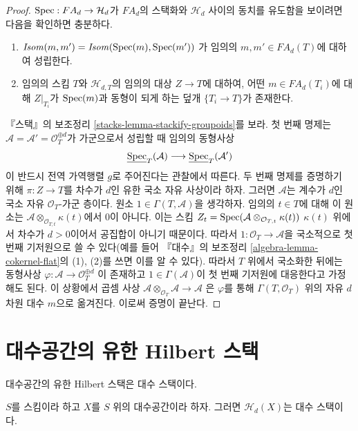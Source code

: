 \begin{proof}
\medskip\noindent
$\mathop{\mathrm{Spec}} : FA_d \to \mathcal{H}_d$가 $FA_d$의 스택화와
$\mathcal{H}_d$ 사이의 동치를 유도함을 보이려면 다음을 확인하면 충분하다.
\begin{enumerate}
\item $\mathit{Isom}(m, m') = \mathit{Isom}(\mathop{\mathrm{Spec}}(m), \mathop{\mathrm{Spec}}(m'))$
가 임의의 $m, m' \in FA_d(T)$에 대하여 성립한다.
\item 임의의 스킴 $T$와 $\mathcal{H}_{d, T}$의 임의의 대상
$Z \to T$에 대하여, 어떤 $m \in FA_d(T_i)$에 대해 $Z|_{T_i}$가
$\mathop{\mathrm{Spec}}(m)$과 동형이 되게 하는 덮개 $\{T_i \to T\}$가 존재한다.
\end{enumerate}
『스택』의 보조정리 \ref{stacks-lemma-stackify-groupoids}를 보라.
첫 번째 명제는 $\mathcal{A} = \mathcal{A}' = \mathcal{O}_T^{\oplus d}$가
가군으로서 성립할 때 임의의 동형사상
$$
\underline{\mathop{\mathrm{Spec}}}_T(\mathcal{A})
\longrightarrow
\underline{\mathop{\mathrm{Spec}}}_T(\mathcal{A}')
$$
이 반드시 전역 가역행렬 $g$로 주어진다는 관찰에서 따른다.
두 번째 명제를 증명하기 위해 $\pi : Z \to T$를 차수가 $d$인
유한 국소 자유 사상이라 하자. 그러면
$\mathcal{A}$는 계수가 $d$인 국소 자유 $\mathcal{O}_T$-가군 층이다.
원소 $1 \in \Gamma(T, \mathcal{A})$을 생각하자. 임의의 $t \in T$에 대해
이 원소는 $\mathcal{A} \otimes_{\mathcal{O}_{T, t}} \kappa(t)$에서
0이 아니다. 이는 스킴
$Z_t = \mathop{\mathrm{Spec}}(\mathcal{A} \otimes_{\mathcal{O}_{T, t}} \kappa(t))$
$\kappa(t)$ 위에서 차수가 $d > 0$이어서 공집합이 아니기 때문이다.
따라서 $1 : \mathcal{O}_T \to \mathcal{A}$을 국소적으로 첫 번째
기저원으로 쓸 수 있다(예를 들어 『대수』의 보조정리
\ref{algebra-lemma-cokernel-flat}의 (1), (2)를 쓰면 이를 알 수 있다).
따라서 $T$ 위에서 국소화한 뒤에는 동형사상
$\varphi : \mathcal{A} \to \mathcal{O}_T^{\oplus d}$
이 존재하고 $1 \in \Gamma(\mathcal{A})$이 첫 번째 기저원에 대응한다고
가정해도 된다. 이 상황에서 곱셈 사상
$\mathcal{A} \otimes_{\mathcal{O}_T} \mathcal{A} \to \mathcal{A}$
은 $\varphi$를 통해 $\Gamma(T, \mathcal{O}_T)$ 위의 자유 $d$차원
대수 $m$으로 옮겨진다. 이로써 증명이 끝난다.
\end{proof}




\section{대수공간의 유한 Hilbert 스택}
\label{section-spaces-hilbert}

\noindent
대수공간의 유한 Hilbert 스택은 대수 스택이다.

\begin{lemma}
\label{lemma-hilbert-stack-of-space}
$S$를 스킴이라 하고 $X$를 $S$ 위의 대수공간이라 하자.
그러면 $\mathcal{H}_d(X)$는 대수 스택이다.
\end{lemma}

